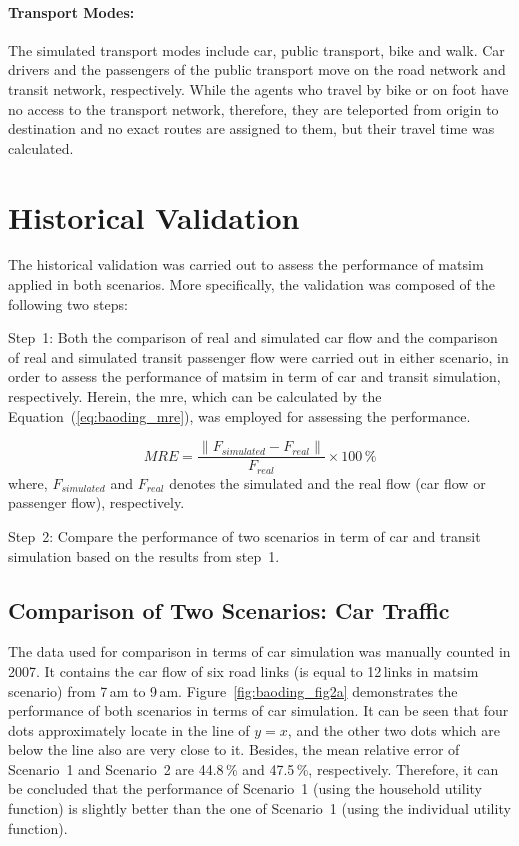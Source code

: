 \paragraph{Transport Modes:} The simulated transport modes include car, public transport, bike and walk. Car drivers and the passengers of the public transport move on the road network and transit network, respectively. While the agents who travel by bike or on foot have no access to the transport network, therefore, they are teleported from origin to destination and no exact routes are assigned to them, but their travel time was calculated. 

\section{Historical Validation}
The historical validation was carried out to assess the performance of \gls{matsim} applied in both scenarios. 
More specifically, the validation was composed of the following two steps:

Step~1: Both the comparison of real and simulated car flow and the comparison of real and simulated transit passenger flow were carried out in either scenario, in order to assess the performance of \gls{matsim} in term of car and transit simulation, respectively. 
Herein, the \gls{mre}, which can be calculated by the Equation~(\ref{eq:baoding_mre}), was employed for assessing the performance.

\begin{equation}
\label{eq:baoding_mre}
MRE = \frac{\lVert F_{simulated} - F_{real} \lVert}{F_{real}} \times 100\,\%
\end{equation} 
where, $F_{simulated}$ and $F_{real}$ denotes the simulated and the real flow (car flow or passenger flow), respectively.

Step~2: Compare the performance of two scenarios in term of car and transit simulation based on the results from step~1. 

\subsection{Comparison of Two Scenarios: Car Traffic}
The data used for comparison in terms of car simulation was manually counted in 2007. 
It contains the car flow of six road links (is equal to 12\,links in \gls{matsim} scenario) from 7\,am to 9\,am. 
Figure~\ref{fig:baoding_fig2a} demonstrates the performance of both scenarios in terms of car simulation. 
It can be seen that four dots approximately locate in the line of $y=x$, and the other two dots which are below the line also are very close to it. 
Besides, the mean relative error of Scenario~1 and Scenario~2 are 44.8\,\% and 47.5\,\%, respectively. 
Therefore, it can be concluded that the performance of Scenario~1 (using the household utility function) is slightly better than the one of Scenario~1 (using the individual utility function). 

